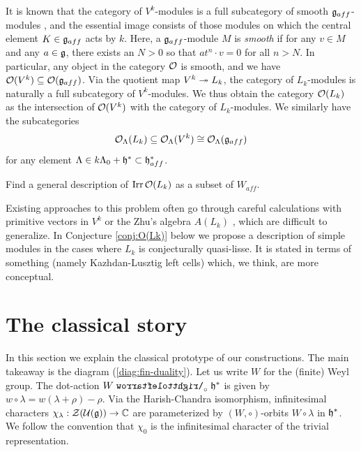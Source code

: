 \documentclass[reqno]{amsart}
\DeclareMathOperator{\Irr}{Irr}
\begin{document}
It is known that the category of $V^k$-modules is a full subcategory of smooth $\mathfrak{g}_{aff}$-modules \cite[Lemma 4.3.2, Theorem 5.1.6]{Frenkel-Ben-Zvi}, and the essential image consists of those modules on which the central element $K \in \mathfrak{g}_{aff}$ acts by $k$. Here, a $\mathfrak{g}_{aff}$-module $M$ is \textit{smooth} if for any $v \in M$ and any $a \in \mathfrak{g}$, there exists an $N > 0$ so that $a t^n \cdot v = 0$ for all $n > N$. In particular, any object in the category $\mathcal{O}$ is smooth, and we have $\mathcal{O}(V^k) \subseteq \mathcal{O}(\mathfrak{g}_{aff})$. Via the quotient map $V^k \twoheadrightarrow L_k$, the category of $L_k$-modules is naturally a full subcategory of $V^k$-modules. We thus obtain the category $\mathcal{O}(L_k)$ as the intersection of $\mathcal{O}(V^k)$ with the category of $L_k$-modules. We similarly have the subcategories
\begin{equation*}
	\mathcal{O}_\Lambda(L_k) \subseteq \mathcal{O}_\Lambda(V^k) \cong \mathcal{O}_\Lambda(\mathfrak{g}_{aff})
\end{equation*}
for any element $\Lambda \in k \Lambda_0 + \mathfrak{h}^* \subset \mathfrak{h}_{aff}^*$.

\begin{problem}\label{prob:O}
	Find a general description of $\Irr \cO(L_k)$ as a subset of $W_{aff}$.
\end{problem}

Existing approaches to this problem often go through careful calculations with primitive vectors in $V^k$ or the Zhu's algebra $A(L_k)$ \cite{Zhu:modular}, which are difficult to generalize. In Conjecture \ref{conj:O(Lk)} below we propose a description of simple modules in the cases where $L_k$ is conjecturally quasi-lisse. It is stated in terms of something (namely Kazhdan-Lusztig left cells) which, we think, are more conceptual.%





\section{The classical story}\label{sec:fin}

In this section we explain the classical prototype of our constructions. The main takeaway is the diagram (\ref{diag:fin-duality}). Let us write $W$ for the (finite) Weyl group. The dot-action $W \acts_\circ \fh^*$ is given by $w \circ \lambda = w (\lambda+\rho) - \rho$. Via the Harish-Chandra isomorphism, infinitesimal characters $\chi_\lambda: \mathcal{Z}(\mathcal{U}(\mathfrak{g})) \to \mathbb{C}$ are parameterized by $(W,\circ)$-orbits $W \circ \lambda$ in $\mathfrak{h}^*$. We follow the convention that $\chi_0$ is the infinitesimal character of the trivial representation.
\end{document}
